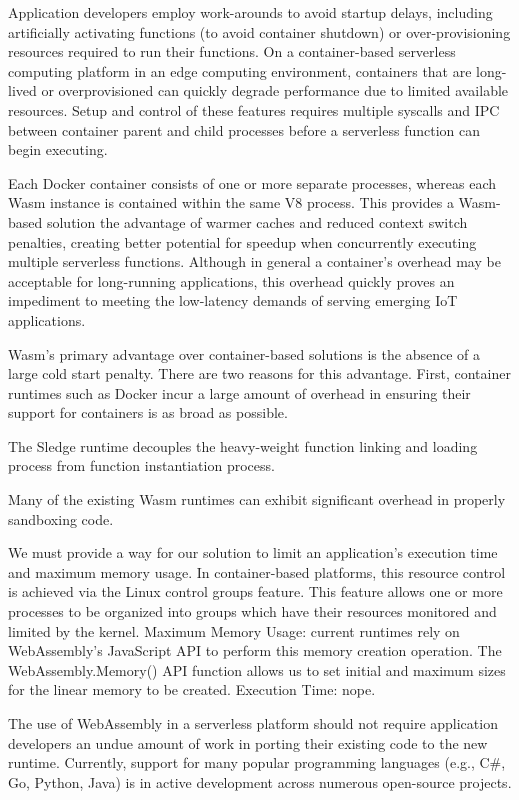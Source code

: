 \documentclass{ieeeaccess}
\begin{document}
Application developers employ work-arounds to avoid startup delays, including artificially activating functions (to avoid container shutdown) or over-provisioning resources required to run their functions. On a container-based serverless computing platform in an edge computing environment, containers that are long-lived or overprovisioned can quickly degrade performance due to limited available resources. Setup and control of these features requires multiple syscalls and IPC between container parent and child processes before a serverless function can begin executing. 

Each Docker container consists of one or more separate processes, whereas each Wasm instance is contained within the same V8 process. This provides a Wasm-based solution the advantage of warmer caches and reduced context switch penalties, creating better potential for speedup when concurrently executing multiple serverless functions. Although in general a container's overhead may be acceptable for long-running applications, this overhead quickly proves an impediment to meeting the low-latency demands of serving emerging IoT applications.

Wasm's primary advantage over container-based solutions is the absence of a large cold start penalty. There are two reasons for this advantage. First, container runtimes such as Docker incur a large amount of overhead in ensuring their support for containers is as broad as possible.

The Sledge runtime decouples the heavy-weight function linking and loading process from function instantiation process.

Many of the existing Wasm runtimes can exhibit significant overhead in properly sandboxing code.

We must provide a way for our solution to limit an application's execution time and maximum memory usage. In container-based platforms, this resource control is achieved via the Linux control groups feature. This feature allows one or more processes to be organized into groups which have their resources monitored and limited by the kernel. Maximum Memory Usage: current runtimes rely on WebAssembly's JavaScript API to perform this memory creation operation. The WebAssembly.Memory() API function allows us to set initial and maximum sizes for the linear memory to be created. Execution Time: nope.

The use of WebAssembly in a serverless platform should not require application developers an undue amount of work in porting their existing code to the new runtime. Currently, support for many popular programming languages (e.g., C\#, Go, Python, Java) is in active development across numerous open-source projects.
\end{document}
